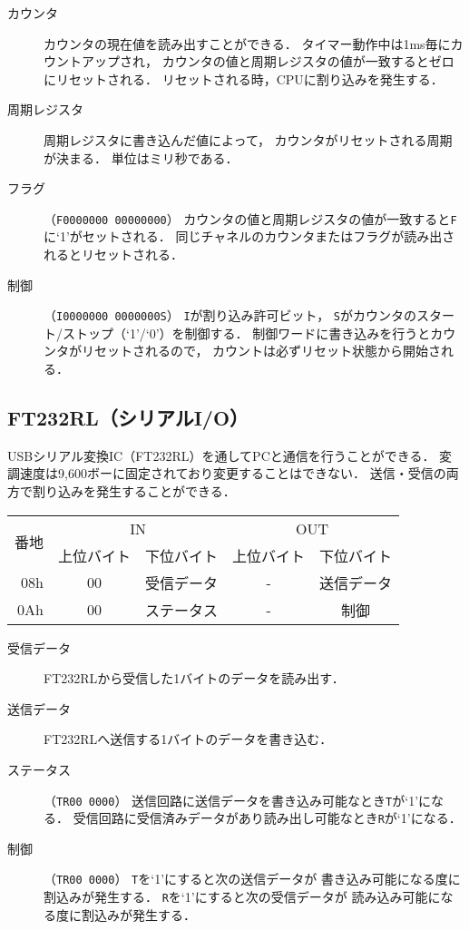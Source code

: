 \begin{description}
\item[カウンタ]
  カウンタの現在値を読み出すことができる．
  タイマー動作中は1ms毎にカウントアップされ，
  カウンタの値と周期レジスタの値が一致するとゼロにリセットされる．
  リセットされる時，CPUに割り込みを発生する．
\item[周期レジスタ]
  周期レジスタに書き込んだ値によって，
  カウンタがリセットされる周期が決まる．
  単位はミリ秒である．
\item[フラグ]（\texttt{F0000000 00000000}）
  カウンタの値と周期レジスタの値が一致すると\texttt{F}に`1'がセットされる．
  同じチャネルのカウンタまたはフラグが読み出されるとリセットされる．
\item[制御]（\texttt{I0000000 0000000S}）
  \texttt{I}が割り込み許可ビット，
  \texttt{S}がカウンタのスタート/ストップ（`1'/`0'）を制御する．
  制御ワードに書き込みを行うとカウンタがリセットされるので，
  カウントは必ずリセット状態から開始される．
\end{description}

\subsection{FT232RL（シリアルI/O）}
USBシリアル変換IC（FT232RL）を通してPCと通信を行うことができる．
変調速度は9,600ボーに固定されており変更することはできない．
送信・受信の両方で割り込みを発生することができる．

\begin{center}
  \small\begin{tabular}{| r | c | c || c | c |}\hline
    \multirow{2}{*}{番地}
    & \multicolumn{2}{|c||}{IN}
    & \multicolumn{2}{c|}{OUT}
    \\\cline{2-5}
         & 上位バイト & 下位バイト & 上位バイト & 下位バイト
    \\\hline\hline
    08h  &  00 & 受信データ
         &  -  & 送信データ \\\hline
    0Ah  &  00 & ステータス
         &  -  & 制御 \\\hline
  \end{tabular}
\end{center}

\begin{description}
\item[受信データ]
  FT232RLから受信した1バイトのデータを読み出す．
\item[送信データ]
  FT232RLへ送信する1バイトのデータを書き込む．
\item[ステータス]（\texttt{TR00 0000}）
  送信回路に送信データを書き込み可能なとき\texttt{T}が`1'になる．
  受信回路に受信済みデータがあり読み出し可能なとき\texttt{R}が`1'になる．
\item[制御]（\texttt{TR00 0000}）
  \texttt{T}を`1'にすると次の送信データが
  書き込み可能になる度に割込みが発生する．
  \texttt{R}を`1'にすると次の受信データが
  読み込み可能になる度に割込みが発生する．
\end{description}

